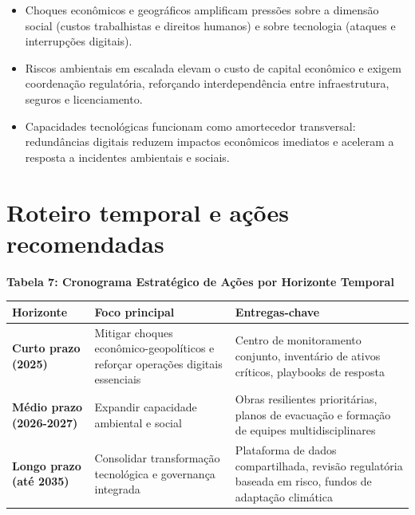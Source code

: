 \documentclass[
  portuguese,
  letterpaper,
  DIV=11,
  numbers=noendperiod]{scrreprt}
\begin{document}
\begin{itemize}
\item
  Choques econômicos e geográficos amplificam pressões sobre a dimensão
  social (custos trabalhistas e direitos humanos) e sobre tecnologia
  (ataques e interrupções digitais).
\item
  Riscos ambientais em escalada elevam o custo de capital econômico e
  exigem coordenação regulatória, reforçando interdependência entre
  infraestrutura, seguros e licenciamento.
\item
  Capacidades tecnológicas funcionam como amortecedor transversal:
  redundâncias digitais reduzem impactos econômicos imediatos e aceleram
  a resposta a incidentes ambientais e sociais.
\end{itemize}

\section{Roteiro temporal e ações
recomendadas}\label{roteiro-temporal-e-auxe7uxf5es-recomendadas}

\textbf{Tabela 7: Cronograma Estratégico de Ações por Horizonte
Temporal}

\begin{longtable}[]{@{}
  >{\raggedright\arraybackslash}p{}
  >{\raggedright\arraybackslash}p{}
  >{\raggedright\arraybackslash}p{}@{}}
\toprule\noalign{}
\begin{minipage}[b]{\linewidth}\raggedright
\textbf{Horizonte}
\end{minipage} & \begin{minipage}[b]{\linewidth}\raggedright
\textbf{Foco principal}
\end{minipage} & \begin{minipage}[b]{\linewidth}\raggedright
\textbf{Entregas-chave}
\end{minipage} \\
\midrule\noalign{}
\endhead
\bottomrule\noalign{}
\endlastfoot
\textbf{Curto prazo (2025)} & Mitigar choques econômico-geopolíticos e
reforçar operações digitais essenciais & Centro de monitoramento
conjunto, inventário de ativos críticos, playbooks de resposta \\
\textbf{Médio prazo (2026-2027)} & Expandir capacidade ambiental e
social & Obras resilientes prioritárias, planos de evacuação e formação
de equipes multidisciplinares \\
\textbf{Longo prazo (até 2035)} & Consolidar transformação tecnológica e
governança integrada & Plataforma de dados compartilhada, revisão
regulatória baseada em risco, fundos de adaptação climática \\
\end{longtable}
\end{document}

